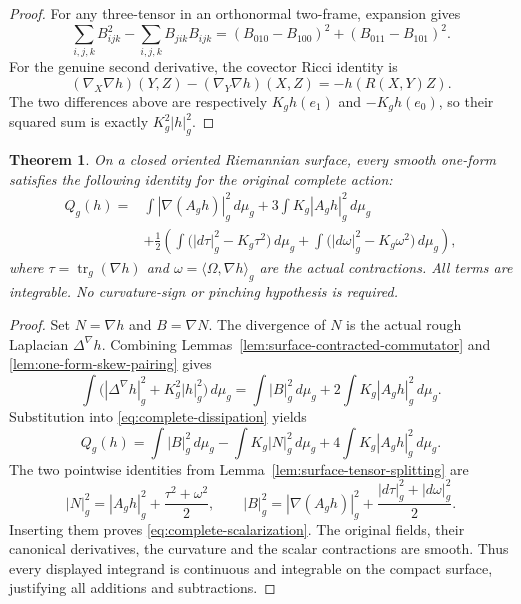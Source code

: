 \documentclass[11pt]{article}
\newtheorem{theorem}{Theorem}[section]
\begin{document}
\begin{proof}
For any three-tensor in an orthonormal two-frame, expansion gives
\[
 \sum_{i,j,k}B_{ijk}^2-\sum_{i,j,k}B_{jik}B_{ijk}
       =(B_{010}-B_{100})^2+(B_{011}-B_{101})^2.
\]
For the genuine second derivative, the covector Ricci identity is
\[
 (\nabla_X\nabla h)(Y,Z)-(\nabla_Y\nabla h)(X,Z)=-h(R(X,Y)Z).
\]
The two differences above are respectively $K_gh(e_1)$ and $-K_gh(e_0)$,
so their squared sum is exactly $K_g^2|h|_g^2$.
\end{proof}

\begin{theorem}\label{thm:complete-scalarization}
On a closed oriented Riemannian surface, every smooth one-form satisfies
the following identity for the original complete action:
\begin{equation}\label{eq:complete-scalarization}
 \begin{split}
 Q_g(h)={}&\int|\nabla(A_gh)|_g^2\,d\mu_g
       +3\int K_g|A_gh|_g^2\,d\mu_g\\
 &+\frac12\left(
       \int\bigl(|d\tau|_g^2-K_g\tau^2\bigr)\,d\mu_g
       +\int\bigl(|d\omega|_g^2-K_g\omega^2\bigr)\,d\mu_g
             \right),
 \end{split}
\end{equation}
where $\tau=\operatorname{tr}_g(\nabla h)$ and
$\omega=\langle\Omega,\nabla h\rangle_g$ are the actual contractions.
All terms are integrable. No curvature-sign or pinching hypothesis is required.
\end{theorem}

\begin{proof}
Set $N=\nabla h$ and $B=\nabla N$. The divergence of $N$ is the actual
rough Laplacian $\Delta^\nabla h$. Combining
Lemmas~\ref{lem:surface-contracted-commutator} and
\ref{lem:one-form-skew-pairing} gives
\begin{equation}\label{eq:second-derivative-energy}
 \int\bigl(|\Delta^\nabla h|_g^2+K_g^2|h|_g^2\bigr)\,d\mu_g
     =\int|B|_g^2\,d\mu_g+2\int K_g|A_gh|_g^2\,d\mu_g.
\end{equation}
Substitution into \eqref{eq:complete-dissipation} yields
\[
 Q_g(h)=\int|B|_g^2\,d\mu_g
           -\int K_g|N|_g^2\,d\mu_g
           +4\int K_g|A_gh|_g^2\,d\mu_g.
\]
The two pointwise identities from Lemma~\ref{lem:surface-tensor-splitting} are
\[
 |N|_g^2=|A_gh|_g^2+\frac{\tau^2+\omega^2}{2},\qquad
 |B|_g^2=|\nabla(A_gh)|_g^2+\frac{|d\tau|_g^2+|d\omega|_g^2}{2}.
\]
Inserting them proves \eqref{eq:complete-scalarization}.
The original fields, their canonical derivatives, the curvature and the
scalar contractions are smooth. Thus every displayed integrand is continuous
and integrable on the compact surface, justifying all additions and subtractions.
\end{proof}
\end{document}
